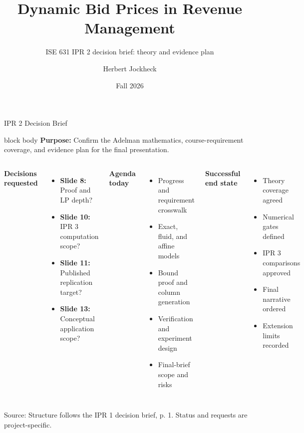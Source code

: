 \documentclass[aspectratio=169,10pt]{beamer}
\title{Dynamic Bid Prices in Revenue Management}
\subtitle{ISE 631 IPR 2 decision brief: theory and evidence plan}
\author{Herbert Jockheck}
\date{Fall 2026}
\newcommand{\src}[1]{\par\vfill{\tiny\color{muted}Source: #1\par}}
\begin{document}
\begin{frame}[t]{IPR 2 Decision Brief}
\small
\begin{beamercolorbox}[sep=0.7em,center,wd=\textwidth]{block body}
\textbf{Purpose:} Confirm the Adelman mathematics, course-requirement coverage, and evidence plan for the final presentation.
\end{beamercolorbox}
\vspace{0.8em}
\begin{columns}[T,onlytextwidth]
\textbf{Decisions requested}\par
\begin{itemize}\setlength{\itemsep}{0.5em}
\item \textbf{Slide 8:} Proof and LP depth?
\item \textbf{Slide 10:} IPR 3 computation scope?
\item \textbf{Slide 11:} Published replication target?
\item \textbf{Slide 13:} Conceptual application scope?
\end{itemize}
\textbf{Agenda today}\par
\begin{itemize}\setlength{\itemsep}{0.5em}
\item Progress and requirement crosswalk
\item Exact, fluid, and affine models
\item Bound proof and column generation
\item Verification and experiment design
\item Final-brief scope and risks
\end{itemize}
\textbf{Successful end state}\par
\begin{itemize}\setlength{\itemsep}{0.5em}
\item Theory coverage agreed
\item Numerical gates defined
\item IPR 3 comparisons approved
\item Final narrative ordered
\item Extension limits recorded
\end{itemize}
\end{columns}
\src{Structure follows the IPR 1 decision brief, p. 1. Status and requests are project-specific.}
\end{frame}
\end{document}
